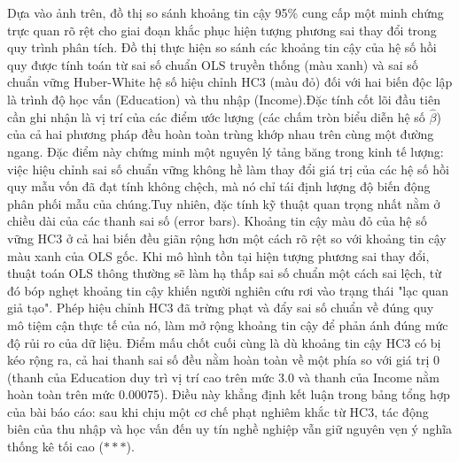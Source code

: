\documentclass[12pt, a4paper]{article}
\begin{document}
Dựa vào ảnh trên, đồ thị so sánh khoảng tin cậy 95\% cung cấp một minh chứng trực quan rõ rệt cho giai đoạn khắc phục hiện tượng phương sai thay đổi trong quy trình phân tích. Đồ thị thực hiện so sánh các khoảng tin cậy của hệ số hồi quy được tính toán từ sai số chuẩn OLS truyền thống (màu xanh) và sai số chuẩn vững Huber-White hệ số hiệu chỉnh HC3 (màu đỏ) đối với hai biến độc lập là trình độ học vấn (Education) và thu nhập (Income).Đặc tính cốt lõi đầu tiên cần ghi nhận là vị trí của các điểm ước lượng (các chấm tròn biểu diễn hệ số $\hat{\beta}$) của cả hai phương pháp đều hoàn toàn trùng khớp nhau trên cùng một đường ngang. Đặc điểm này chứng minh một nguyên lý tảng băng trong kinh tế lượng: việc hiệu chỉnh sai số chuẩn vững không hề làm thay đổi giá trị của các hệ số hồi quy mẫu vốn đã đạt tính không chệch, mà nó chỉ tái định lượng độ biến động phân phối mẫu của chúng.Tuy nhiên, đặc tính kỹ thuật quan trọng nhất nằm ở chiều dài của các thanh sai số (error bars). Khoảng tin cậy màu đỏ của hệ số vững HC3 ở cả hai biến đều giãn rộng hơn một cách rõ rệt so với khoảng tin cậy màu xanh của OLS gốc. Khi mô hình tồn tại hiện tượng phương sai thay đổi, thuật toán OLS thông thường sẽ làm hạ thấp sai số chuẩn một cách sai lệch, từ đó bóp nghẹt khoảng tin cậy khiến người nghiên cứu rơi vào trạng thái "lạc quan giả tạo". Phép hiệu chỉnh HC3 đã trừng phạt và đẩy sai số chuẩn về đúng quy mô tiệm cận thực tế của nó, làm mở rộng khoảng tin cậy để phản ánh đúng mức độ rủi ro của dữ liệu. Điểm mấu chốt cuối cùng là dù khoảng tin cậy HC3 có bị kéo rộng ra, cả hai thanh sai số đều nằm hoàn toàn về một phía so với giá trị 0 (thanh của Education duy trì vị trí cao trên mức 3.0 và thanh của Income nằm hoàn toàn trên mức 0.00075). Điều này khẳng định kết luận trong bảng tổng hợp của bài báo cáo: sau khi chịu một cơ chế phạt nghiêm khắc từ HC3, tác động biên của thu nhập và học vấn đến uy tín nghề nghiệp vẫn giữ nguyên vẹn ý nghĩa thống kê tối cao ($***$).
	\newpage
\end{document}
